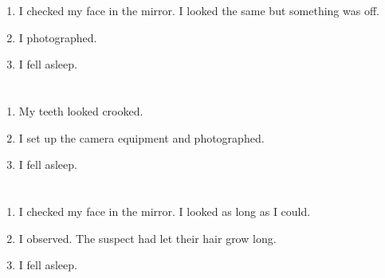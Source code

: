 \documentclass{article}
\begin{document}
    \newpage
    
    \section{}
    
    \begin{enumerate}
    
    \item I checked my face in the mirror. I looked the same but something was off.\\
    
    \item I photographed.\\
    
    \item I fell asleep.\\
    
    \end{enumerate}
     
    \newpage
    
    \section{}
    
    \begin{enumerate}
    
    \item My teeth looked crooked.\\
    
    \item I set up the camera equipment and photographed.\\
    
    \item I fell asleep.\\
    
    \end{enumerate}
     
    \newpage
    
    \section{}
    
    \begin{enumerate}
    
    \item I checked my face in the mirror. I looked as long as I could.\\
    
    \item I observed. The suspect had let their hair grow long.\\
    
    \item I fell asleep.\\
    
    \end{enumerate}
     
\end{document}
